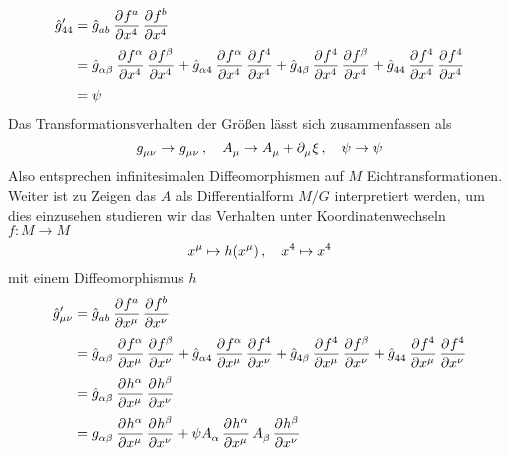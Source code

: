 \begin{equation}
\begin{split}
\tensor*{\hat{g}}{*^\prime_4_4}&=\tensor{\hat{g}}{_a_b}\dpd{f^a}{\tensor{x}{^4}}\dpd{f^b}{\tensor{x}{^4}}\\
&=\tensor{\hat{g}}{_\alpha_\beta}\dpd{f^\alpha}{\tensor{x}{^4}}\dpd{f^\beta}{\tensor{x}{^4}}
+\tensor{\hat{g}}{_\alpha_4}\dpd{f^\alpha}{\tensor{x}{^4}}\dpd{f^4}{\tensor{x}{^4}}
+\tensor{\hat{g}}{_4_\beta}\dpd{f^4}{\tensor{x}{^4}}\dpd{f^\beta}{\tensor{x}{^4}}
+\tensor{\hat{g}}{_4_4}\dpd{f^4}{\tensor{x}{^4}}\dpd{f^4}{\tensor{x}{^4}}\\
&=\psi
\end{split}
\end{equation}
Das Transformationsverhalten der Größen lässt sich zusammenfassen als 
\begin{equation}
\tensor{g}{_\mu_\nu}\to\tensor{g}{_\mu_\nu}\,,\quad
\tensor{A}{_\mu}\to\tensor{A}{_\mu}+\pdif{_\mu}\xi\,,\quad
\psi\to\psi
\end{equation}
Also entsprechen infinitesimalen Diffeomorphismen auf $M$ Eichtransformationen.
Weiter ist zu Zeigen das $A$ als Differentialform $M/G$ interpretiert werden,
um dies einzusehen studieren wir das Verhalten unter Koordinatenwechseln $f:M\to
M$
\begin{equation}
\tensor{x}{^\mu}\mapsto
h(\tensor{x}{^\mu})\,,\quad\tensor{x}{^4}\mapsto\tensor{x}{^4}
\end{equation}
mit einem Diffeomorphismus $h$
\begin{equation}
\begin{split}
\tensor*{\hat{g}}{*^\prime_\mu_\nu}&=\tensor{\hat{g}}{_a_b}\dpd{f^a}{\tensor{x}{^\mu}}\dpd{f^b}{\tensor{x}{^\nu}}\\
&=\tensor{\hat{g}}{_\alpha_\beta}\dpd{f^\alpha}{\tensor{x}{^\mu}}\dpd{f^\beta}{\tensor{x}{^\nu}}
+\tensor{\hat{g}}{_\alpha_4}\dpd{f^\alpha}{\tensor{x}{^\mu}}\dpd{f^4}{\tensor{x}{^\nu}}
+\tensor{\hat{g}}{_4_\beta}\dpd{f^4}{\tensor{x}{^\mu}}\dpd{f^\beta}{\tensor{x}{^\nu}}
+\tensor{\hat{g}}{_4_4}\dpd{f^4}{\tensor{x}{^\mu}}\dpd{f^4}{\tensor{x}{^\nu}}\\
&=\tensor{\hat{g}}{_\alpha_\beta}\dpd{h^\alpha}{\tensor{x}{^\mu}}\dpd{h^\beta}{\tensor{x}{^\nu}}\\
&=\tensor{g}{_\alpha_\beta}\dpd{h^\alpha}{\tensor{x}{^\mu}}\dpd{h^\beta}{\tensor{x}{^\nu}}
+\psi\tensor{A}{_\alpha}\dpd{h^\alpha}{\tensor{x}{^\mu}}
\tensor{A}{_\beta}\dpd{h^\beta}{\tensor{x}{^\nu}}
\end{split}
\end{equation}
